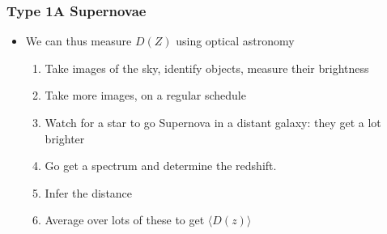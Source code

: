 \documentclass{beamer}
\begin{document}
\frame
{

    \frametitle{Type 1A Supernovae}


    \begin{itemize}

        \item We can thus measure {\color{gold} $D(Z)$} using optical astronomy 

            \begin{enumerate}

                \item Take images of the sky, identify objects, measure their brightness

                \item Take more images, on a regular schedule

                \item Watch for a star to go Supernova in a distant
                    galaxy: they get a lot brighter

                \item Go get a spectrum and determine the redshift.

                \item Infer the distance

                \item Average over lots of these to get {\color{gold} $\langle
                    D(z) \rangle$ }

            \end{enumerate}

    \end{itemize}

}
\end{document}
